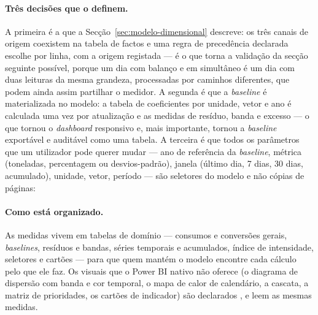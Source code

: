 \paragraph{Três decisões que o definem.} A primeira é a que a
Secção~\ref{sec:modelo-dimensional} descreve: os três canais de origem
coexistem na tabela de factos e uma regra de precedência declarada escolhe
por linha, com a origem registada --- é o que torna a validação da secção
seguinte possível, porque um dia com balanço e  em simultâneo é
um dia com duas leituras da mesma grandeza, processadas por caminhos
diferentes, que podem ainda assim partilhar o medidor. A segunda é que a
\emph{baseline} é materializada no modelo: a tabela de coeficientes por
unidade, vetor e ano é calculada uma vez por atualização e as medidas de
resíduo, banda e excesso  --- o que tornou o \emph{dashboard} responsivo e,
mais importante, tornou a \emph{baseline} exportável e auditável como uma
tabela. A terceira é que todos os parâmetros que um utilizador pode querer
mudar --- ano de referência da \emph{baseline}, métrica (toneladas,
percentagem ou desvios-padrão), janela (último dia, 7 dias, 30 dias,
acumulado), unidade, vetor, período --- são seletores do modelo e não
cópias de páginas: 

\paragraph{Como está organizado.} As medidas vivem em tabelas de domínio
--- consumos e conversões gerais, \emph{baselines}, resíduos e bandas,
séries temporais e acumulados, índice de intensidade, seletores e cartões
--- para que quem mantém o modelo encontre cada cálculo pelo que ele faz.
Os visuais que o Power BI nativo não oferece (o diagrama de dispersão com
banda e cor temporal, o mapa de calor de calendário, a cascata, a matriz
de prioridades, os cartões de indicador) são declarados , e leem as
mesmas medidas. 

